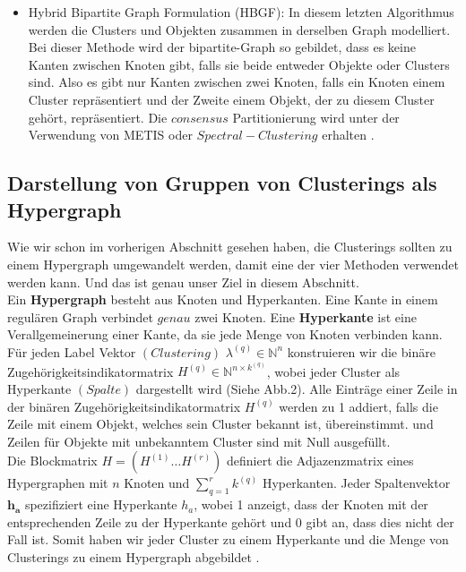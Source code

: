 \documentclass[runningheads]{llncs}
\begin{document}
\begin{itemize}
	\item Hybrid Bipartite Graph Formulation (HBGF): In diesem letzten Algorithmus werden die Clusters und Objekten zusammen in derselben Graph modelliert. Bei dieser Methode wird der bipartite-Graph so gebildet, dass es keine Kanten zwischen Knoten gibt, falls sie beide entweder Objekte oder Clusters sind. Also es gibt nur Kanten zwischen zwei Knoten, falls ein Knoten einem Cluster repräsentiert und der Zweite einem Objekt, der zu diesem Cluster gehört, repräsentiert. Die $consensus$ Partitionierung wird unter der Verwendung von METIS oder $Spectral-Clustering$ erhalten \cite{vega2011survey}.  
\end{itemize}  


\subsection{Darstellung von Gruppen von Clusterings als Hypergraph}
Wie wir schon im vorherigen Abschnitt gesehen haben, die Clusterings sollten zu einem Hypergraph umgewandelt werden, damit eine der vier Methoden verwendet werden kann. Und das ist genau unser Ziel in diesem Abschnitt.\\
Ein \textbf{Hypergraph} besteht aus Knoten und Hyperkanten. Eine Kante in einem regulären Graph verbindet $genau$ zwei Knoten. Eine \textbf{Hyperkante} ist eine Verallgemeinerung einer Kante, da sie jede Menge von Knoten verbinden kann.\\
Für jeden Label Vektor $(Clustering)$ $\lambda^{(q)} \in \mathbb{N}^{n}$ konstruieren wir die binäre Zugehörigkeitsindikatormatrix  $H^{(q)} \in \mathbb{N}^{n \times k^{(q)}}$, wobei jeder Cluster als Hyperkante $(Spalte)$ dargestellt wird (Siehe Abb.2). Alle Einträge einer Zeile in der binären Zugehörigkeitsindikatormatrix $H^{(q)}$ werden zu 1 addiert, falls die Zeile mit einem Objekt, welches sein Cluster bekannt ist, übereinstimmt. und Zeilen für Objekte mit unbekanntem Cluster sind mit Null ausgefüllt.\\
Die Blockmatrix $H = (H^{(1)} \ldots H^{(r)})$ definiert die Adjazenzmatrix eines Hypergraphen mit $n$ Knoten und $\sum_{q=1}^{r} k^{(q)}$ Hyperkanten. Jeder Spaltenvektor $\boldsymbol{h_{a}}$ spezifiziert eine Hyperkante $h_{a}$, wobei 1 anzeigt, dass der Knoten mit der entsprechenden Zeile zu der Hyperkante gehört und 0 gibt an, dass dies nicht der Fall ist. Somit haben wir jeder Cluster zu einem Hyperkante und die Menge von Clusterings zu einem Hypergraph abgebildet \cite{strehl2002cluster}.\\ 
\end{document}
